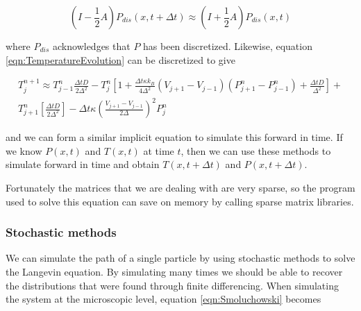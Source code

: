\documentclass[11pt]{article} %
\begin{document}
\begin{equation}
\left (I - \frac{1}{2} A \right) P_{dis}(x, t + \Delta t) \approx \left(I + \frac{1}{2}A \right)P_{dis}(x, t)
\end{equation}

where $P_{dis}$ acknowledges that $P$ has been discretized. Likewise, equation \ref{eqn:TemperatureEvolution} can be discretized to give

\begin{multline}
T^{n+1}_j \approx T^n_{j-1} \frac{\Delta t D}{2 \Delta^2} - T^n_j \left[1 + \frac{\Delta t \kappa k_B}{4 \Delta^2}(V_{j+1} - V_{j-1})(P^n_{j+1} - P^n_{j-1}) + \frac{\Delta t D}{\Delta^2} \right] + \\
 T^n_{j+1} \left [\frac{\Delta t D}{2 \Delta^2} \right] - \Delta t \kappa \left(\frac{V_{j+1} - V_{j-1}}{2 \Delta} \right )^2 P^n_j
\end{multline}

and we can form a similar implicit equation to simulate this forward in time. If we know $P(x, t)$ and $T(x, t)$ at time $t$, then we can use these methods to simulate forward in time and obtain $T(x, t + \Delta t)$ and $P(x, t + \Delta t)$.

Fortunately the matrices that we are dealing with are very sparse, so the program used to solve this equation can save on memory by calling sparse matrix libraries.

%
%
\subsubsection{Stochastic methods}
We can simulate the path of a single particle by using stochastic methods to solve the Langevin equation. By simulating many times we should be able to recover the distributions that were found through finite differencing. When simulating the system  at the microscopic level, equation \ref{eqn:Smoluchowski} becomes \cite{Reimann2001}
\end{document}
